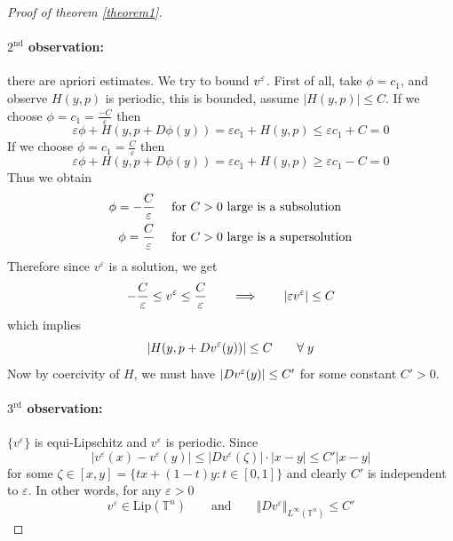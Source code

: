 \documentclass[12pt, oneside]{amsart}  	%
\begin{document}
\begin{proof}[Proof of theorem \ref{theorem1}]
\paragraph{\textbf{$2^{\text{nd}}$ observation:}} there are apriori estimates. We try to bound $v^\varepsilon$. First of all, take $\phi=c_1$, and observe $H(y,p)$ is periodic, this is bounded, assume $|H(y,p)|\leq C$. If we choose $\phi = c_1 = \frac{-C}{\varepsilon}$ then
\begin{equation*}
\varepsilon \phi + H(y,p+D\phi(y)) = \varepsilon c_1 + H(y,p) \leq \varepsilon c_1 + C =0
\end{equation*}
If we choose $\phi = c_1 = \frac{C}{\varepsilon}$ then
\begin{equation*}
\varepsilon \phi + H(y,p+D\phi(y)) = \varepsilon c_1 + H(y,p) \geq \varepsilon c_1 - C =0
\end{equation*}
Thus we obtain 
\begin{align*}
\phi = -\frac{C}{\varepsilon}\quad &\text{ for $C>0$ large is a subsolution} \\
\phi = \frac{C}{\varepsilon}\quad &\text{ for $C>0$ large is a supersolution}
\end{align*}
Therefore since $v^\varepsilon$ is a solution, we get
\begin{equation*}
-\frac{C}{\varepsilon} \le v^\varepsilon \le \frac{C}{\varepsilon} \qquad\Longrightarrow\qquad |\varepsilon v^\varepsilon| \leq C
\end{equation*}
which implies 
\begin{equation*}
|H(y, p + Dv^\varepsilon(y))|\le C \qquad\forall\;y
\end{equation*}
Now by coercivity of $H$, we must have $|Dv^\varepsilon(y)|\le C'$ for some constant $C'>0$.\\

\paragraph{\textbf{$3^{\text{rd}}$ observation:}} $\{v^\varepsilon\}$ is equi-Lipschitz and $v^\varepsilon$ is periodic. Since
\begin{equation*}
|v^\varepsilon(x) - v^\varepsilon(y)|\leq |Dv^\varepsilon(\zeta)|\cdot |x-y| \leq C'|x-y|
\end{equation*}
for some $\zeta\in [x,y] = \{tx+(1-t)y: t\in [0,1]\}$ and clearly $C'$ is independent to $\varepsilon$. In other words, for any $\varepsilon>0$
\begin{equation*}
v^\varepsilon \in \text{Lip}(\mathbb{T}^n)\qquad\text{and}\qquad \Vert Dv^\varepsilon\Vert_{L^\infty(\mathbb{T}^n)} \leq C'
\end{equation*}


\end{proof}
\end{document}
